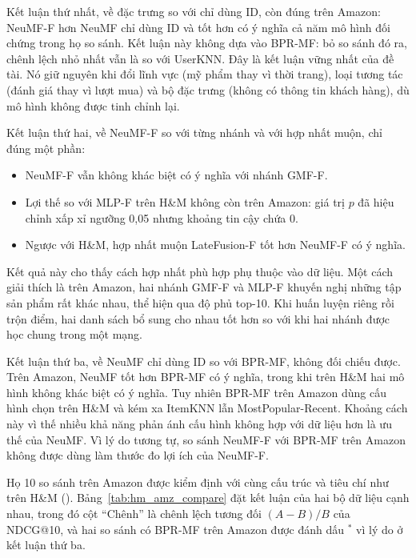 Kết luận thứ nhất, về đặc trưng so với chỉ dùng ID, còn đúng trên Amazon: NeuMF-F hơn NeuMF chỉ dùng ID  và tốt hơn có ý nghĩa cả năm mô hình đối chứng trong họ so sánh. Kết luận này không dựa vào BPR-MF: bỏ so sánh đó ra, chênh lệch nhỏ nhất vẫn là  so với UserKNN. Đây là kết luận vững nhất của đề tài. Nó giữ nguyên khi đổi lĩnh vực (mỹ phẩm thay vì thời trang), loại tương tác (đánh giá thay vì lượt mua) và bộ đặc trưng (không có thông tin khách hàng), dù mô hình không được tinh chỉnh lại.

Kết luận thứ hai, về NeuMF-F so với từng nhánh và với hợp nhất muộn, chỉ đúng một phần:
\begin{itemize}
    \item NeuMF-F vẫn không khác biệt có ý nghĩa với nhánh GMF-F.
    \item Lợi thế so với MLP-F trên H\&M không còn trên Amazon: giá trị $p$ đã hiệu chỉnh xấp xỉ ngưỡng 0,05 nhưng khoảng tin cậy chứa 0.
    \item Ngược với H\&M, hợp nhất muộn LateFusion-F tốt hơn NeuMF-F có ý nghĩa.
\end{itemize}

Kết quả này cho thấy cách hợp nhất phù hợp phụ thuộc vào dữ liệu. Một cách giải thích là trên Amazon, hai nhánh GMF-F và MLP-F khuyến nghị những tập sản phẩm rất khác nhau, thể hiện qua độ phủ top-10. Khi huấn luyện riêng rồi trộn điểm, hai danh sách bổ sung cho nhau tốt hơn so với khi hai nhánh được học chung trong một mạng.

Kết luận thứ ba, về NeuMF chỉ dùng ID so với BPR-MF, không đối chiếu được. Trên Amazon, NeuMF tốt hơn BPR-MF có ý nghĩa, trong khi trên H\&M hai mô hình không khác biệt có ý nghĩa. Tuy nhiên BPR-MF trên Amazon dùng cấu hình chọn trên H\&M và kém xa ItemKNN lẫn MostPopular-Recent. Khoảng cách này vì thế nhiều khả năng phản ánh cấu hình không hợp với dữ liệu hơn là ưu thế của NeuMF. Vì lý do tương tự, so sánh NeuMF-F với BPR-MF trên Amazon không được dùng làm thước đo lợi ích của NeuMF-F.

Họ 10 so sánh trên Amazon được kiểm định với cùng cấu trúc và tiêu chí như trên H\&M (). Bảng~\ref{tab:hm_amz_compare} đặt kết luận của hai bộ dữ liệu cạnh nhau, trong đó cột ``Chênh'' là chênh lệch tương đối $(A - B)/B$ của NDCG@10, và hai so sánh có BPR-MF trên Amazon được đánh dấu $^{*}$ vì lý do ở kết luận thứ ba.


